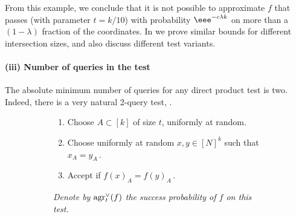 \documentclass{toc}
\newcommand\f{f} %
\newcommand{\test}[2]{
	\ifx &#2&
	\textrm{agr}^{#1}
	\else	
	\textrm{agr}^{#1}_{#2}
	\fi}
\begin{document}
From this example, we conclude that it is not possible to approximate $\f$ that passes  (with parameter $t=k/10$) with probability $\eee^{-c\lambda k}$ on more than %
a $(1-\lambda)$ fraction   %
of the coordinates. In  we prove similar bounds for different intersection sizes, and also discuss different test variants.

\paragraph*{(iii) Number of queries in the test}
The absolute %
%
minimum  %
number of queries for any direct product test is two. Indeed, there is a very natural 2-query test, .
\begin{figure}
%
\label{test:2 query test}
	\centering
	\begin{subfigure}{0.58\textwidth}
		\begin{enumerate}
			\item Choose $A\subset[k]$ of size $t$, uniformly at random.
			\item Choose uniformly at random $x,y\in[N]^k$ such that $x_A = y_A$\,.
			\item Accept if $\f(x)_A = \f(y)_A$\,.
		\end{enumerate}
	\end{subfigure}
	\hfill
%
	\begin{subfigure}{0.4\textwidth}
		\centering
	\end{subfigure}
	\vspace{2pt}
%
	\begin{subfigure}{\textwidth}
		\vspace{5pt}
		\emph{Denote by $\test{\vee}{t}(f)$ the success probability of $\f$ on this test.}
	\end{subfigure}
\end{figure}
\end{document}
